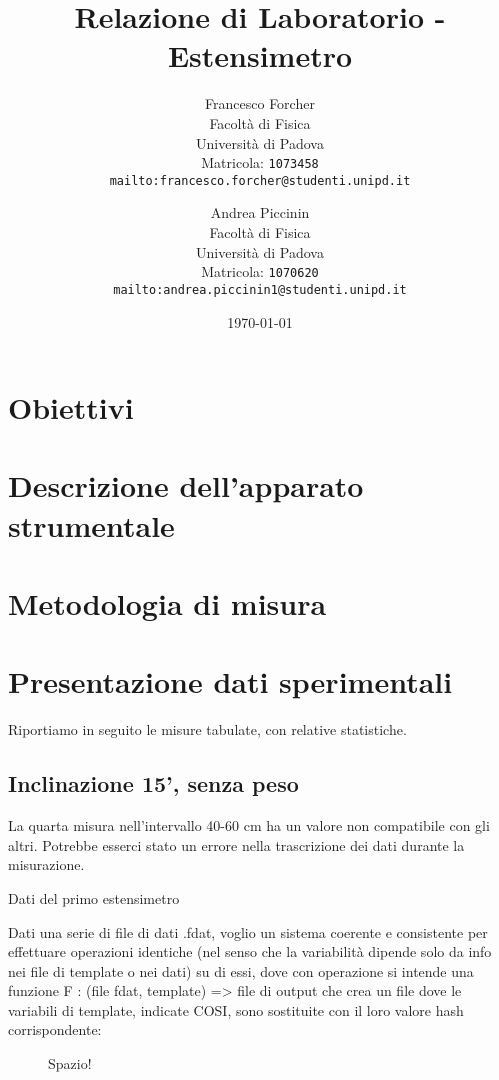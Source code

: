 \documentclass[12pt]{article} %
\title {Relazione di Laboratorio - Estensimetro}
\author{Francesco Forcher\\
Facoltà di Fisica\\
Università di Padova\\
Matricola: \texttt{1073458}\\
\texttt{mailto:francesco.forcher@studenti.unipd.it}\\
\and
Andrea Piccinin\\ 
Facoltà di Fisica\\
Università di Padova\\
Matricola: \texttt{1070620}\\
\texttt{mailto:andrea.piccinin1@studenti.unipd.it}\\
}
\date{\today}
\begin{document}
\maketitle %
\tableofcontents %



        

\section{Obiettivi}
		
\section{Descrizione dell'apparato strumentale}
		
\section{Metodologia di misura}
		
\section{Presentazione dati sperimentali}			
	Riportiamo in seguito le misure tabulate, con relative statistiche.
	
	\subsection {Inclinazione 15', senza peso}
	La quarta misura nell'intervallo 40-60 cm ha un valore non compatibile con gli altri. Potrebbe esserci stato un errore nella trascrizione dei dati durante la misurazione.
	\begin{grafico}
    \centering
		
		\caption{Dati del primo estensimetro}
		\label{fig:spazio1}
	\end{grafico}
	Dati una serie di file di dati .fdat, voglio un sistema coerente e consistente per effettuare operazioni
	identiche (nel senso che la variabilità dipende solo da info nei file di template o nei dati) su di essi, dove
	con operazione si intende una funzione F : (file fdat, template) => file di output che crea un file dove
	le variabili di template, indicate COSI, sono sostituite con il loro valore hash corrispondente: 

	
	\begin{figure}[H]
    \centering
		
		\caption{Spazio!}
		\label{fig:spazio1}
	\end{figure}
\end{document}
